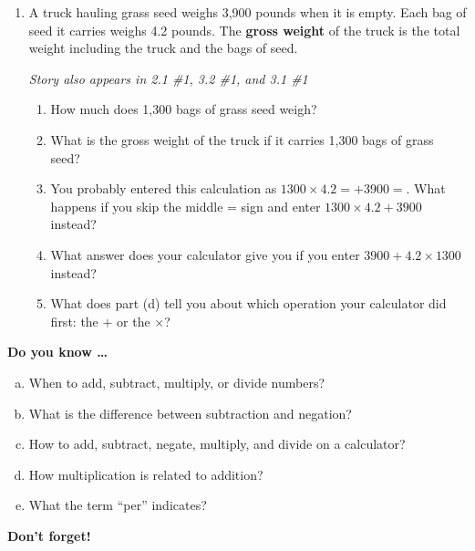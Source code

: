 \begin{enumerate}
\item A truck hauling grass seed weighs 3,900 pounds when it is empty. Each bag of seed it carries weighs 4.2 pounds.  The \textbf{gross weight} of the truck is the total weight including the truck and the bags of seed. 

\hfill \emph{Story also appears in 2.1 \#1, 3.2 \#1, and 3.1 \#1}
\begin{enumerate}
\item How much does 1,300 bags of grass seed weigh? 
\vfill
\item What is the gross weight of the truck if it carries 1,300 bags of grass seed?
\vfill
\item You probably entered this calculation as $1300 \times 4.2 = + 3900=$.  What happens if you skip the middle = sign and enter $1300 \times 4.2 + 3900$ instead?
\vfill
\item What answer does your calculator give you if you enter $3900 + 4.2 \times 1300$ instead?
\vfill
\item What does part (d) tell you about which operation your calculator did first: the $+$ or the $\times$? 
\vfill
\end{enumerate}

\end{enumerate} %

\newpage



\bigskip

\noindent \textbf{Do you know \ldots}

\begin{enumerate}[(a)]
\item When to add, subtract, multiply, or divide numbers? \vfill
\item What is the difference between subtraction and negation? \vfill %
\item How to add, subtract, negate, multiply, and divide on a calculator? \vfill
\item How multiplication is related to addition? \vfill
\item What the term ``per'' indicates? \vfill
\end{enumerate}

\noindent \textbf{Don't forget!}
\vfill \vfill \vfill




